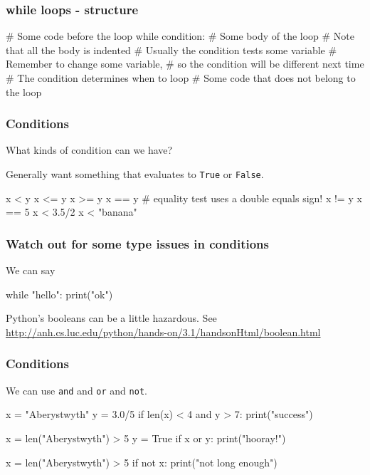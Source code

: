 \documentclass{beamer}
\begin{document}
\begin{frame}[fragile]
\frametitle{while loops - structure}
\begin{code}
# Some code before the loop
while condition:
   # Some body of the loop
   # Note that all the body is indented
   # Usually the condition tests some variable
   # Remember to change some variable, 
   # so the condition will be different next time
   # The condition determines when to loop
# Some code that does not belong to the loop
\end{code}

\end{frame}

\begin{frame}[fragile]
\frametitle{Conditions}
What kinds of condition can we have?

Generally want something that evaluates to {\tt True} or {\tt False}.

\begin{code}
x < y
x <= y
x >= y
x == y    # equality test uses a double equals sign!
x != y
x == 5
x < 3.5/2
x < "banana"
\end{code}
\end{frame}

\begin{frame}[fragile]
\frametitle{Watch out for some type issues in conditions}

We can say 
\begin{code}
while "hello":
  print("ok")
\end{code}
Python's booleans can be a little hazardous.  See \url{http://anh.cs.luc.edu/python/hands-on/3.1/handsonHtml/boolean.html}
\end{frame}


\begin{frame}[fragile]
\frametitle{Conditions}
We can use {\tt and} and {\tt or} and {\tt not}.

\begin{code}
x = "Aberystwyth"
y = 3.0/5
if len(x) < 4 and y > 7:
   print("success")

x = len("Aberystwyth") > 5
y = True
if x or y:
   print("hooray!")

x = len("Aberystwyth") > 5
if not x:
   print("not long enough")
\end{code}
\end{frame}
\end{document}

